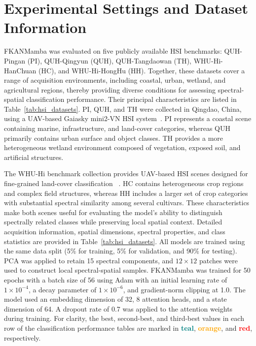 \documentclass{ieeeaccess}
\begin{document}
\section{Experimental Settings and Dataset Information}
\label{sec:experiments}

FKANMamba was evaluated on five publicly available HSI benchmarks: QUH-Pingan (PI), QUH-Qingyun (QUH), QUH-Tangdaowan (TH), WHU-Hi-HanChuan (HC), and WHU-Hi-HongHu (HH). Together, these datasets cover a range of acquisition environments, including coastal, urban, wetland, and agricultural regions, thereby providing diverse conditions for assessing spectral-spatial classification performance. Their principal characteristics are listed in Table~\ref{tab:hsi_datasets}. PI, QUH, and TH were collected in Qingdao, China, using a UAV-based Gaiasky mini2-VN HSI system~\cite{ref30}. PI represents a coastal scene containing marine, infrastructure, and land-cover categories, whereas QUH primarily contains urban surface and object classes. TH provides a more heterogeneous wetland environment composed of vegetation, exposed soil, and artificial structures.

The WHU-Hi benchmark collection provides UAV-based HSI scenes designed for fine-grained land-cover classification ~\cite{ref31}. HC contains heterogeneous crop regions and complex field structures, whereas HH includes a larger set of crop categories with substantial spectral similarity among several cultivars. These characteristics make both scenes useful for evaluating the model's ability to distinguish spectrally related classes while preserving local spatial context. Detailed acquisition information, spatial dimensions, spectral properties, and class statistics are provided in Table~\ref{tab:hsi_datasets}. All models are trained using the same data split (5\% for training, 5\% for validation, and 90\% for testing). PCA was applied to retain 15 spectral components, and $12\times12$ patches were used to construct local spectral-spatial samples. FKANMamba was trained for 50 epochs with a batch size of 56 using Adam with an initial learning rate of $1\times10^{-4}$, a decay parameter of $1\times10^{-6}$, and gradient-norm clipping at 1.0. The model used an embedding dimension of 32, 8 attention heads, and a state dimension of 64. A dropout rate of 0.7 was applied to the attention weights during training. For clarity, the best, second-best, and third-best values in each row of the classification performance tables are marked in \textcolor{teal}{\textbf{teal}}, \textcolor{orange}{\textbf{orange}}, and \textcolor{red}{\textbf{red}}, respectively.
\end{document}
